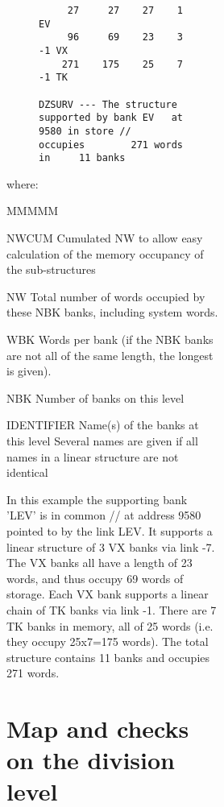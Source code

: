 \begin{figure}
\begin{figure}
\begin{figure}
\begin{figure}
\begin{verbatim}
     27     27    27    1      EV
     96     69    23    3        -1 VX
    271    175    25    7             -1 TK
 
DZSURV --- The structure supported by bank EV   at       9580 in store //       occupies        271 words  in     11 banks
\end{verbatim}
\end{figure}
where:
\begin{DL}{MMMMM}
\item[NWCUM
]Cumulated NW to allow easy calculation of
the memory occupancy of the sub-structures
\item[NW
]Total number of words occupied by these NBK banks,
including system words.
\item[WBK
]Words per bank (if the NBK banks are not all
of the same length, the longest is given).
\item[NBK
]Number of banks on this level
\item[IDENTIFIER
]Name(s) of the banks at this level
\newline Several names are given if all names
in a linear structure are not identical
\end{DL}
\par In this example
the supporting bank 'LEV' is in common // at address
9580 pointed to by the link LEV.
\newline
It supports a linear structure of 3 VX banks via link -7.
The VX banks all
have a length of 23 words, and thus occupy 69 words of storage.
Each VX bank supports a linear chain of
TK banks via link -1.
\newline
There are 7 TK banks in memory, all of 25 words
(i.e. they occupy 25x7=175 words).
\newline
The total structure contains 11 banks and occupies 271 words.
\section{Map and checks on the division level}

\end{figure}
\end{figure}
\end{figure}
